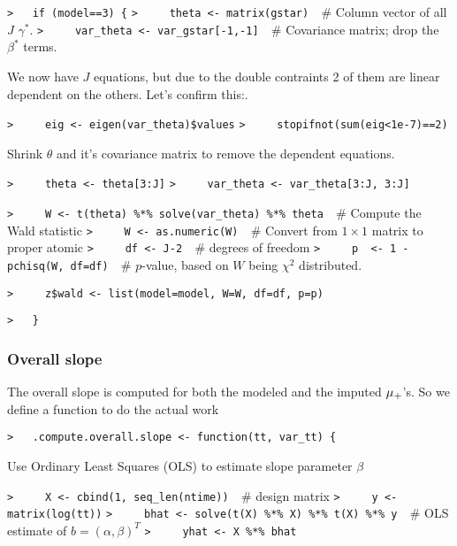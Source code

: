 \documentclass[a4paper]{article}
\begin{document}
\verb~>   if (model==3) {~\newline
\verb~>     theta <- matrix(gstar)  ~{\sffamily\# Column vector of all $J$ $\gamma^\ast$.}\newline
\verb~>     var_theta <- var_gstar[-1,-1]  ~{\sffamily\# Covariance matrix; drop the $\beta^\ast$ terms.}\par

We now have $J$ equations, but due to the double contraints 2 of them are linear
dependent on the others. Let's confirm this:.\par
\verb~>     eig <- eigen(var_theta)$values~\newline
\verb~>     stopifnot(sum(eig<1e-7)==2)~\par

Shrink $\theta$ and it's covariance matrix to remove the dependent equations.\par
\verb~>     theta <- theta[3:J]~\newline
\verb~>     var_theta <- var_theta[3:J, 3:J]~\par

\verb~>     W <- t(theta) %*% solve(var_theta) %*% theta  ~{\sffamily\# Compute the Wald statistic}\newline
\verb~>     W <- as.numeric(W)  ~{\sffamily\# Convert from $1\times1$ matrix to proper atomic}\newline
\verb~>     df <- J-2  ~{\sffamily\# degrees of freedom}\newline
\verb~>     p  <- 1 - pchisq(W, df=df)  ~{\sffamily\# $p$-value, based on $W$ being $\chi^2$ distributed.}\par

\verb~>     z$wald <- list(model=model, W=W, df=df, p=p)~\par

\verb~>   }~\par


\subsubsection{Overall slope}\par

The overall slope is computed for both the modeled and the imputed ${\mu_{+}}$'s.
So we define a function to do the actual work\par
\verb~>   .compute.overall.slope <- function(tt, var_tt) {~\par
Use Ordinary Least Squares (OLS) to estimate slope parameter $\beta$\par
\verb~>     X <- cbind(1, seq_len(ntime))  ~{\sffamily\# design matrix}\newline
\verb~>     y <- matrix(log(tt))~\newline
\verb~>     bhat <- solve(t(X) %*% X) %*% t(X) %*% y  ~{\sffamily\# OLS estimate of $b = (\alpha,\beta)^T$}\newline
\verb~>     yhat <- X %*% bhat~\par
\end{document}
